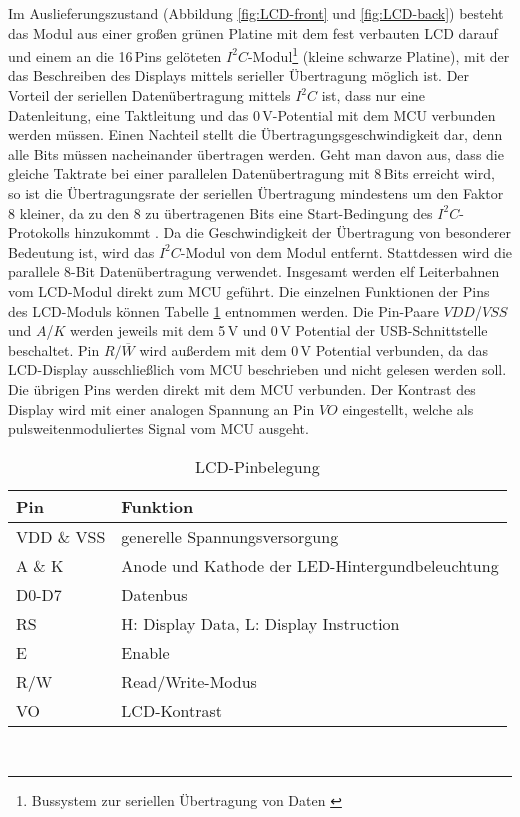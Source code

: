 Im Auslieferungszustand (Abbildung \ref{fig:LCD-front} und \ref{fig:LCD-back}) besteht das Modul aus einer großen grünen Platine mit dem fest verbauten LCD darauf und einem an die 16\,Pins gelöteten $I^2C$-Modul\footnote{Bussystem zur seriellen Übertragung von Daten \cite[S. 61]{MCU_in_Practice}} (kleine schwarze Platine), mit der das Beschreiben des Displays mittels serieller Übertragung möglich ist. Der Vorteil der seriellen Datenübertragung mittels $I^2C$ ist, dass nur eine Datenleitung, eine Taktleitung und das 0\,V-Potential mit dem MCU verbunden werden müssen. Einen Nachteil stellt die Übertragungsgeschwindigkeit dar, denn alle Bits müssen nacheinander übertragen werden. Geht man davon aus, dass die gleiche Taktrate bei einer parallelen Datenübertragung mit 8\,Bits erreicht wird, so ist die Übertragungsrate der seriellen Übertragung mindestens um den Faktor 8 kleiner, da zu den 8 zu übertragenen Bits eine Start-Bedingung des $I^2C$-Protokolls hinzukommt \cite[S. 62]{MCU_in_Practice}. Da die Geschwindigkeit der Übertragung von besonderer Bedeutung ist, wird das $I^2C$-Modul von dem Modul entfernt. Stattdessen wird die parallele 8-Bit Datenübertragung verwendet. Insgesamt werden elf Leiterbahnen vom LCD-Modul direkt zum MCU geführt. Die einzelnen Funktionen der Pins des LCD-Moduls können Tabelle \ref{tab:LCD_Pins} entnommen werden. Die Pin-Paare $VDD$/$VSS$ und $A$/$K$ werden jeweils mit dem 5\,V und 0\,V Potential der USB-Schnittstelle beschaltet. Pin $R/\overline{W}$ wird außerdem mit dem 0\,V Potential verbunden, da das LCD-Display ausschließlich vom MCU beschrieben und nicht gelesen werden soll. Die übrigen Pins werden direkt mit dem MCU verbunden. Der Kontrast des Display wird mit einer analogen Spannung an Pin $VO$ eingestellt, welche als pulsweitenmoduliertes Signal vom MCU ausgeht.
\begin{table}[h]
	\begin{center}
		\caption{LCD-Pinbelegung \cite[s. 7]{LCD_MN}}
		\begin{tabular}{l | l}
			\textbf{Pin} & \textbf{Funktion}\\
			\hline
			VDD \& VSS & generelle Spannungsversorgung\\
			A \& K & Anode und Kathode der LED-Hintergundbeleuchtung\\
			D0-D7 & Datenbus\\
			RS & H: Display Data, L: Display Instruction\\
			E & Enable\\
			R/W & Read/Write-Modus\\
			VO & LCD-Kontrast\\
		\end{tabular}
	\label{tab:LCD_Pins}
	\end{center}
\end{table}\\

